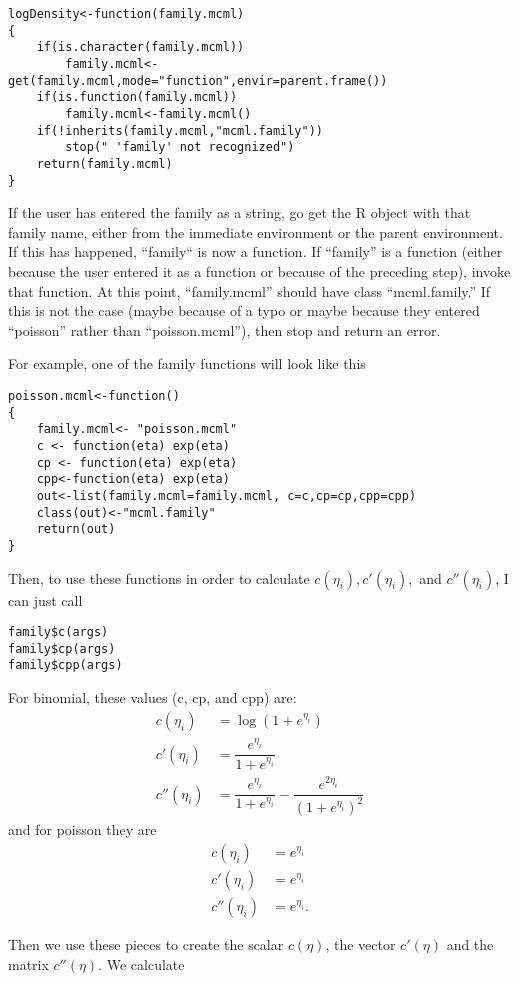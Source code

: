 \documentclass{article}
\begin{document}
\begin{verbatim}
logDensity<-function(family.mcml)
{
	if(is.character(family.mcml))
		family.mcml<-get(family.mcml,mode="function",envir=parent.frame())
	if(is.function(family.mcml))
		family.mcml<-family.mcml()
	if(!inherits(family.mcml,"mcml.family")) 
		stop(" 'family' not recognized") 
	return(family.mcml)
}
\end{verbatim}
If the user has entered the family as a string, go get the R object with that family name, either from the immediate environment or the parent environment.  If this has happened, ``family`` is now a function.  If ``family'' is a function (either because the user entered it as a function or because of the preceding step), invoke that function.  At this point, ``family.mcml'' should have  class ``mcml.family.'' If this is not the case (maybe because of a typo or maybe because they entered ``poisson'' rather than ``poisson.mcml''), then stop and return an error.


For example, one of the family functions will look like this
\begin{verbatim}
poisson.mcml<-function()
{
	family.mcml<- "poisson.mcml"
	c <- function(eta) exp(eta)
	cp <- function(eta) exp(eta)
	cpp<-function(eta) exp(eta)
	out<-list(family.mcml=family.mcml, c=c,cp=cp,cpp=cpp)
	class(out)<-"mcml.family"
	return(out)
}
\end{verbatim}

Then, to use these functions in order to calculate $c(\eta_i), c'(\eta_i),$ and  $c''(\eta_i)$, I can just call 
\begin{verbatim}
family$c(args)
family$cp(args)
family$cpp(args)
\end{verbatim}

For  binomial, these values (c, cp, and cpp) are:
\begin{align}
c(\eta_i)&=\log(1+e^{\eta_i})\\
c'(\eta_i)&=\dfrac{ e^{{\eta_{i}}}}{ 1+e^{{\eta_{i}}}}\\
c''(\eta_i)&=   \dfrac{e^{{\eta_{i}}}}{  1+ e^{{\eta_{i}}} }  - \dfrac{e^{2{\eta_{i}}}}{    (  1+ e^{{\eta_{i}}})^2}  
\end{align}
and for poisson they are
\begin{align}
c(\eta_i)&=e^{\eta_i}\\
c'(\eta_i)&=e^{{\eta_{i}}}\\
c''(\eta_i)&= e^{{\eta_{i}}}.
\end{align}

Then we use these pieces to create the scalar $c(\eta)$, the vector $c'(\eta)$ and the matrix $c''(\eta)$. We calculate
\end{document}
